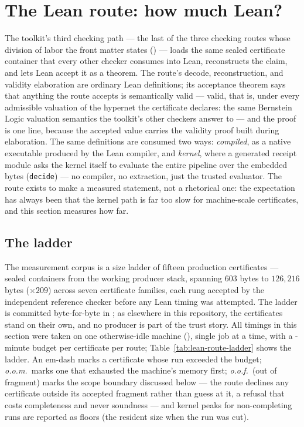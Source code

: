 

\section{The Lean route: how much Lean?}
\label{sec:exp-lean-route}

The toolkit's third checking path --- the last of the three checking
routes whose division of labor the front matter states
() --- loads the same
sealed certificate container that every other checker consumes into
Lean, reconstructs the claim, and lets Lean accept it as a theorem. The route's decode,
reconstruction, and validity elaboration are ordinary Lean definitions;
its acceptance theorem says that anything the route accepts is
semantically valid --- valid, that is, under every admissible
valuation of the hypernet the certificate declares: the same
Bernstein Logic valuation semantics the toolkit's other checkers
answer to --- and the proof is one line, because the accepted
value carries the validity proof built during elaboration. The same
definitions are consumed two ways: \emph{compiled}, as a native
executable produced by the Lean compiler, and \emph{kernel}, where a
generated receipt module asks the kernel itself to evaluate the entire
pipeline over the embedded bytes (\texttt{decide}) --- no compiler, no
extraction, just the trusted evaluator. The route exists to make a
measured statement, not a rhetorical one: the expectation has always
been that the kernel path is far too slow for machine-scale
certificates, and this section measures how far.

\subsection{The ladder}

The measurement corpus is a size ladder of fifteen production
certificates --- sealed containers from the working producer stack,
spanning $603$ bytes to $126{,}216$ bytes ($\times 209$) across seven
certificate families, each rung accepted by the independent reference
checker before any Lean timing was attempted. The ladder is committed
byte-for-byte in ; as elsewhere in this
repository, the certificates stand on their own, and no producer is
part of the trust story. All timings in this section were taken on one
otherwise-idle machine (\LeanRouteHost), single job at a time, with a
\LeanRouteBudgetMin-minute budget per certificate per route;
Table~\ref{tab:lean-route-ladder} shows the ladder. An em-dash marks a
certificate whose run exceeded the budget; \emph{o.o.m.}\ marks one
that exhausted the machine's memory first; \emph{o.o.f.}\ (out of
fragment) marks the scope boundary discussed below --- the route
declines any certificate outside its accepted fragment rather than
guess at it, a refusal that costs completeness and never soundness ---
and kernel peaks for non-completing runs are reported as floors (the
resident size when the run was cut).

